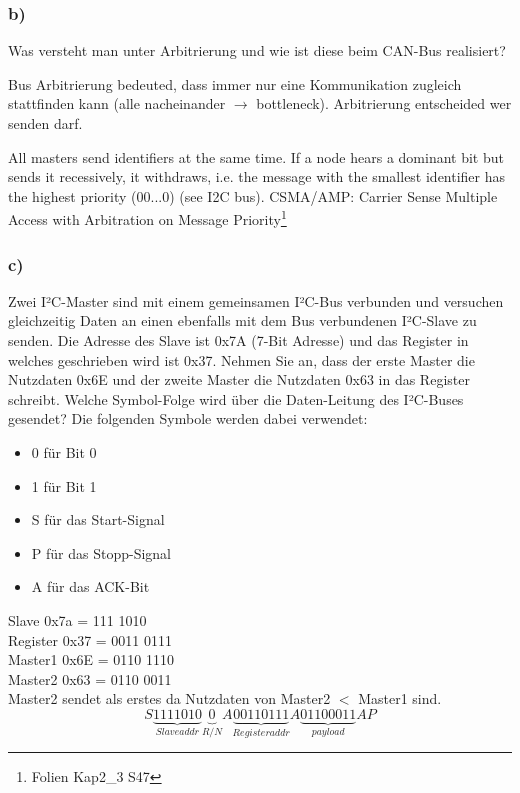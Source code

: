 \subsubsection{b)}
Was versteht man unter Arbitrierung und wie ist diese beim CAN-Bus realisiert?

Bus Arbitrierung bedeuted, dass immer nur eine Kommunikation zugleich stattfinden kann (alle nacheinander $\rightarrow$ bottleneck).
Arbitrierung entscheided wer senden darf.

All masters send identifiers at the same time. If a node hears a dominant bit
but sends it recessively, it withdraws, i.e. the message with the smallest
identifier has the highest priority (00...0) (see I2C bus).
CSMA/AMP: Carrier Sense Multiple Access with Arbitration on Message
Priority\footnote{Folien Kap2\_3 S47}

\subsubsection{c)}
Zwei I²C-Master sind mit einem gemeinsamen I²C-Bus verbunden und versuchen gleichzeitig Daten an
einen ebenfalls mit dem Bus verbundenen I²C-Slave zu senden. Die Adresse des Slave ist 0x7A (7-Bit
Adresse) und das Register in welches geschrieben wird ist 0x37. Nehmen Sie an, dass der erste Master
die Nutzdaten 0x6E und der zweite Master die Nutzdaten 0x63 in das Register schreibt. Welche
Symbol-Folge wird über die Daten-Leitung des I²C-Buses gesendet? Die folgenden Symbole werden
dabei verwendet: 

\begin{itemize}
  \item 0 für Bit 0
  \item 1 für Bit 1
  \item S für das Start-Signal
  \item P für das Stopp-Signal
  \item A für das ACK-Bit
\end{itemize}
Slave 0x7a = 111 1010\\
Register 0x37 = 0011 0111\\
Master1 0x6E = 0110 1110\\
Master2 0x63 = 0110 0011\\

Master2 sendet als erstes da Nutzdaten von Master2 $<$ Master1 sind. 
\begin{equation}
  S\underbrace{1111010}_{Slave addr}\underbrace{0}_{R/N}A\underbrace{00110111}_{Register addr}A\underbrace{01100011}_{payload}AP
\end{equation}

